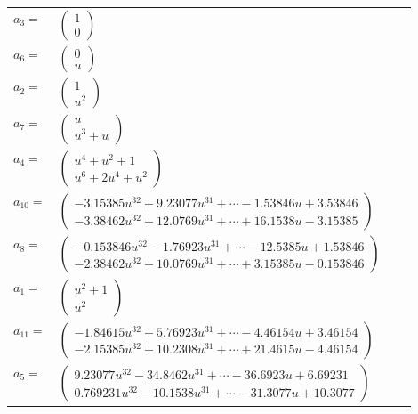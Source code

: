 \documentclass[1p]{elsarticle_modified}
\theoremstyle{definition}
\begin{document}
\begin{tabular}{m{7pt} m{180pt} m{7pt} m{180pt} }
\flushright $a_{3}=$&$\begin{pmatrix}1\\0\end{pmatrix}$ \\
\flushright $a_{6}=$&$\begin{pmatrix}0\\u\end{pmatrix}$ \\
\flushright $a_{2}=$&$\begin{pmatrix}1\\u^2\end{pmatrix}$ \\
\flushright $a_{7}=$&$\begin{pmatrix}u\\u^3+u\end{pmatrix}$ \\
\flushright $a_{4}=$&$\begin{pmatrix}u^4+u^2+1\\u^6+2 u^4+u^2\end{pmatrix}$ \\
\flushright $a_{10}=$&$\begin{pmatrix}-3.15385 u^{32}+9.23077 u^{31}+\cdots-1.53846 u+3.53846\\-3.38462 u^{32}+12.0769 u^{31}+\cdots+16.1538 u-3.15385\end{pmatrix}$ \\
\flushright $a_{8}=$&$\begin{pmatrix}-0.153846 u^{32}-1.76923 u^{31}+\cdots-12.5385 u+1.53846\\-2.38462 u^{32}+10.0769 u^{31}+\cdots+3.15385 u-0.153846\end{pmatrix}$ \\
\flushright $a_{1}=$&$\begin{pmatrix}u^2+1\\u^2\end{pmatrix}$ \\
\flushright $a_{11}=$&$\begin{pmatrix}-1.84615 u^{32}+5.76923 u^{31}+\cdots-4.46154 u+3.46154\\-2.15385 u^{32}+10.2308 u^{31}+\cdots+21.4615 u-4.46154\end{pmatrix}$ \\
\flushright $a_{5}=$&$\begin{pmatrix}9.23077 u^{32}-34.8462 u^{31}+\cdots-36.6923 u+6.69231\\0.769231 u^{32}-10.1538 u^{31}+\cdots-31.3077 u+10.3077\end{pmatrix}$ \\

\end{tabular}
\end{document}
